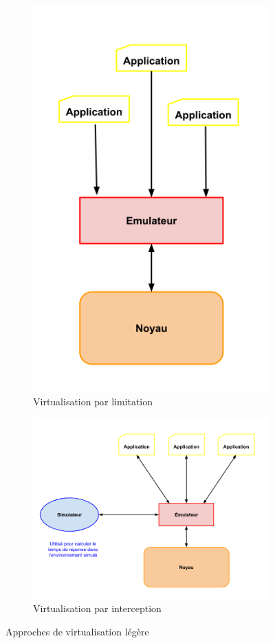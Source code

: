 \begin{figure}[H]
  \centering
  \begin{subfigure}{0.4\textwidth}
    \includegraphics[scale=0.39]{Pictures/png/Virtualisation_limitation}
    \caption{Virtualisation par limitation}
    \label{Virtu_limitation}
  \end{subfigure}
  \begin{subfigure}{0.4\textwidth}
    \includegraphics[scale=0.3]{Pictures/png/Virtualisation_interception}
    \caption{Virtualisation par interception}
    \label{Virtu_interception}
  \end{subfigure}
  \caption{Approches de virtualisation légère}
  \label{TYPE_VIRTUALISATION}
\end{figure}
